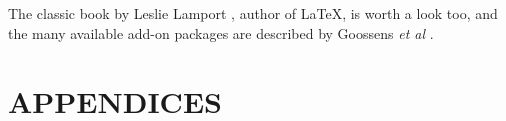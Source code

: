 \documentclass[letterpaper,12pt,titlepage,oneside,final]{book}
\let\origdoublepage\cleardoublepage
\newcommand{\clearemptydoublepage}{%
  \clearpage{\pagestyle{empty}\origdoublepage}}
\let\cleardoublepage\clearemptydoublepage
\begin{document}
The classic book by Leslie Lamport \cite{lamport.book}, author of \LaTeX , is worth a look too, and the many available add-on packages are described by 
Goossens \textit{et al} \cite{goossens.book}.




\cleardoublepage %
\renewcommand*{\bibname}{References}




\nocite{*}


\appendix
\chapter*{APPENDICES}
\end{document}
